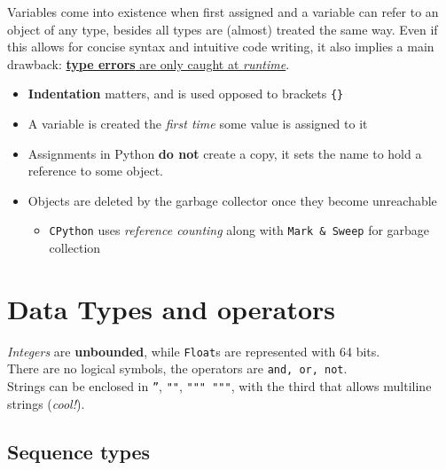 Variables come into existence when first assigned and a variable can refer to an object of any type,
besides all types are (almost) treated the same way.
Even if this allows for concise syntax and intuitive code writing, it also implies a main drawback: \underline{\textbf{type errors} are only caught at \textit{runtime}}.

\begin{itemize}
   \item \textbf{Indentation} matters, and is used opposed to brackets \texttt{\{\}}
   \item A variable is created the \textit{first time} some value is assigned to it
   \item Assignments in Python \textbf{do not} create a copy, it sets the name to hold a reference to some object.
   \item Objects are deleted by the garbage collector once they become unreachable
   \begin{itemize}
      \item \texttt{CPython} uses \textit{reference counting} along with \texttt{Mark \& Sweep} for garbage collection
   \end{itemize}
   \end{itemize}

\section{Data Types and operators}
\textit{Integers} are \textbf{unbounded},
while \texttt{Float}s are represented with 64 bits.\\
There are no logical symbols, the operators are \texttt{and, or, not}.\\
Strings can be enclosed in \texttt{''}, \texttt{""}, \texttt{""" """},
with the third that allows multiline strings (\textit{cool!}).

\subsection{Sequence types}
\lstset{language=python}

